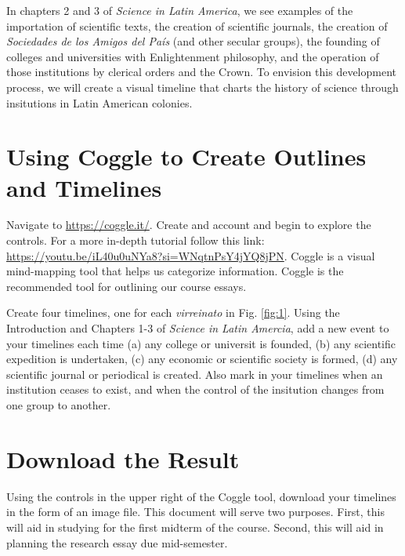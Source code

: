 \documentclass[12pt]{article}
\begin{document}
In chapters 2 and 3 of \textit{Science in Latin America}, we see examples of the importation of scientific texts, the creation of scientific journals, the creation of \textit{Sociedades de los Amigos del Pa\'{i}s} (and other secular groups), the founding of colleges and universities with Enlightenment philosophy, and the operation of those institutions by clerical orders and the Crown.  To envision this development process, we will create a visual timeline that charts the history of science through insitutions in Latin American colonies.

\section{Using Coggle to Create Outlines and Timelines}

Navigate to \url{https://coggle.it/}.  Create and account and begin to explore the controls.  For a more in-depth tutorial follow this link: \url{https://youtu.be/iL40u0uNYa8?si=WNqtnPsY4jYQ8jPN}.  Coggle is a visual mind-mapping tool that helps us categorize information.  Coggle is the recommended tool for outlining our course essays.

Create four timelines, one for each \textit{virreinato} in Fig. \ref{fig:1}.  Using the Introduction and Chapters 1-3 of \textit{Science in Latin Amercia}, add a new event to your timelines each time (a) any college or universit is founded, (b) any scientific expedition is undertaken, (c) any economic or scientific society is formed, (d) any scientific journal or periodical is created.  Also mark in your timelines when an institution ceases to exist, and when the control of the insitution changes from one group to another.

\section{Download the Result}

Using the controls in the upper right of the Coggle tool, download your timelines in the form of an image file.  This document will serve two purposes.  First, this will aid in studying for the first midterm of the course.  Second, this will aid in planning the research essay due mid-semester.
\end{document}
